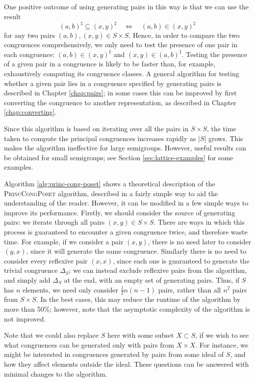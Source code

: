 One positive outcome of using generating pairs in this way is that we can use
the result
$$(a,b)^\sharp \subseteq (x,y)^\sharp \quad\iff\quad (a,b) \in (x,y)^\sharp$$
for any two pairs $(a,b), (x,y) \in S \times S$.  Hence, in order to compare the
two congruences comprehensively, we only need to test the presence of one pair
in each congruence: $(a,b) \in (x,y)^\sharp$ and $(x,y) \in (a,b)^\sharp$.
Testing the presence of a given pair in a congruence is likely to be faster
than, for example, exhaustively computing its congruence classes.  A general
algorithm for testing whether a given pair lies in a congruence specified by
generating pairs is described in Chapter \ref{chap:pairs}; in some cases this
can be improved by first converting the congruence to another representation, as
described in Chapter \ref{chap:converting}.

Since this algorithm is based on iterating over all the pairs in $S \times S$,
the time taken to compute the principal congruences increases rapidly as $|S|$
grows.  This makes the algorithm ineffective for large semigroups.  However,
useful results can be obtained for small semigroups; see Section
\ref{sec:lattice-examples} for some examples.

Algorithm \ref{alg:princ-cong-poset} shows a theoretical description of the
\textsc{PrincCongPoset} algorithm, described in a fairly simple way to aid the
understanding of the reader.  However, it can be modified in a few simple ways
to improve its performance.  Firstly, we should consider the source of
generating pairs: we iterate through all pairs $(x,y) \in S \times S$.  There
are ways in which this process is guaranteed to encounter a given congruence
twice, and therefore waste time.  For example, if we consider a pair $(x,y)$,
there is no need later to consider $(y,x)$, since it will generate the same
congruence.  Similarly there is no need to consider every reflexive pair
$(x,x)$, since each one is guaranteed to generate the trivial congruence
$\Delta_S$; we can instead exclude reflexive pairs from the algorithm, and
simply add $\Delta_S$ at the end, with an empty set of generating pairs.  Thus,
if $S$ has $n$ elements, we need only consider $\frac{1}{2}n(n-1)$ pairs, rather
than all $n^2$ pairs from $S \times S$.  In the best cases, this may reduce the
runtime of the algorithm by more than 50\%; however, note that the asymptotic
complexity of the algorithm is not improved.

Note that we could also replace $S$ here with some subset $X \subset S$, if we
wish to see what congruences can be generated only with pairs from $X \times X$.
For instance, we might be interested in congruences generated by pairs from some
ideal of $S$, and how they affect elements outside the ideal.  These questions
can be answered with minimal changes to the algorithm.


